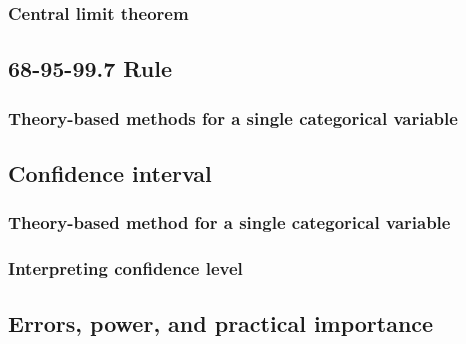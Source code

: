 \documentclass[
]{report}
\begin{document}
\hypertarget{central-limit-theorem}{%
\subsubsection*{Central limit theorem}\label{central-limit-theorem}}

\hypertarget{rule}{%
\subsection*{68-95-99.7 Rule}\label{rule}}

\hypertarget{theory-based-methods-for-a-single-categorical-variable}{%
\subsubsection*{Theory-based methods for a single categorical variable}\label{theory-based-methods-for-a-single-categorical-variable}}

\hypertarget{confidence-interval-1}{%
\subsection*{Confidence interval}\label{confidence-interval-1}}

\hypertarget{theory-based-method-for-a-single-categorical-variable}{%
\subsubsection*{Theory-based method for a single categorical variable}\label{theory-based-method-for-a-single-categorical-variable}}

\hypertarget{interpreting-confidence-level}{%
\subsubsection*{Interpreting confidence level}\label{interpreting-confidence-level}}

\hypertarget{errors-power-and-practical-importance}{%
\subsection*{Errors, power, and practical importance}\label{errors-power-and-practical-importance}}
\end{document}
